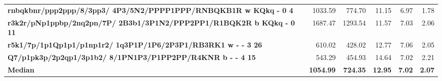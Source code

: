 \begin{tabular}{|p{8cm}|*{5}{r|}}
    \rowcolor[HTML]{FFFFFF}
    \textbf{rnbqkbnr/ppp2ppp/8/3pp3/ 4P3/5N2/PPPP1PPP/RNBQKB1R w KQkq - 0 4}        & 1033.59 & 774.70 & 11.15 & 6.97 & 1.78 \\

    \rowcolor[HTML]{EFEFEF}
    \textbf{r3k2r/pNp1ppbp/2nq2pn/7P/ 2B3b1/3P1N2/PPP2PP1/R1BQK2R b KQkq - 0 11}    & 1687.47 & 1293.54 & 11.57 & 7.03 & 2.06 \\

    \rowcolor[HTML]{FFFFFF}
    \textbf{r5k1/7p/1p1Qp1p1/p1np1r2/ 1q3P1P/1P6/2P3P1/RB3RK1 w - - 3 26}           & 610.02                                                            & 428.02 & 12.77 & 7.06 & 2.05 \\

    \rowcolor[HTML]{EFEFEF}
    \textbf{Q7/p1pk3p/2p2qp1/3p1b2/ 8/1PN1P3/P1PP2PP/R4KNR b - - 4 15}              & 543.29                                                            & 454.93 & 14.64 & 7.02 & 2.21 \\
    \hline
    \hline
    \rowcolor[HTML]{FFFFFF}
    \textbf{Median}                                                                 & \textbf{1054.99}                                                  & \textbf{724.35}                                          & \textbf{12.95}                                         & \textbf{7.02}                                 & \textbf{2.07}                                            \\

    \hline
\end{tabular}%